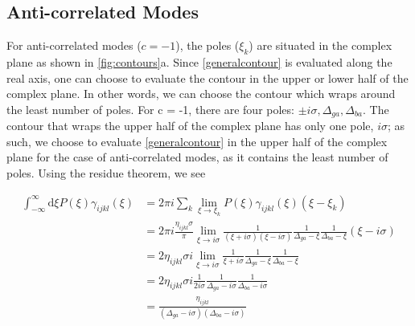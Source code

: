 \documentclass[aip, jcp, reprint, onecolumn, nofootinbib]{revtex4-2}
\begin{document}
\subsection{Anti-correlated Modes}
For anti-correlated modes ($c = -1$), the poles ($\xi_k$) are situated in the complex plane as shown in \autoref{fig:contours}a.
Since \autoref{generalcontour} is evaluated along the real axis, one can choose to evaluate the contour in the upper or lower half of the complex plane.
In other words, we can choose the contour which wraps around the least number of poles.
For c = -1, there are four poles: $\pm i \sigma, \Delta_{ga}, \Delta_{ba}$. 
The contour that wraps the upper half of the complex plane has only one pole, $i \sigma$; as such, we choose to evaluate \autoref{generalcontour} in the upper half of the complex plane for the case of anti-correlated modes, as it contains the least number of poles.
Using the residue theorem, we see
\begin{widetext}
	\begin{equation}
		\begin{split}
			\int_{-\infty}^\infty \mathrm{d}\xi P(\xi) \gamma_{ijkl}(\xi) &= 2\pi i \sum_k \lim_{\xi \rightarrow \xi_k} P(\xi) \gamma_{ijkl}(\xi) (\xi - \xi_k)\\
			&= 2\pi i \frac{\eta_{ijkl} \sigma}{\pi} \lim_{\xi \rightarrow i\sigma} \frac{1}{(\xi + i\sigma)(\xi - i\sigma)} \frac{1}{\Delta_{ga} - \xi} \frac{1}{\Delta_{ba} - \xi} (\xi - i \sigma)\\
			&= 2 \eta_{ijkl} \sigma i \lim_{\xi \rightarrow i\sigma} \frac{1}{\xi + i\sigma} \frac{1}{\Delta_{ga} - \xi} \frac{1}{\Delta_{ba} - \xi}\\
			&= 2\eta_{ijkl} \sigma i \frac{1}{2i\sigma} \frac{1}{\Delta_{ga} - i\sigma} \frac{1}{\Delta_{ba} - i\sigma}\\
			&= \frac{\eta_{ijkl}}{\left(\Delta_{ga}-i\sigma\right)\left(\Delta_{ba}-i \sigma\right)}\\
		\end{split}
	\end{equation}
\end{widetext}
\end{document}
